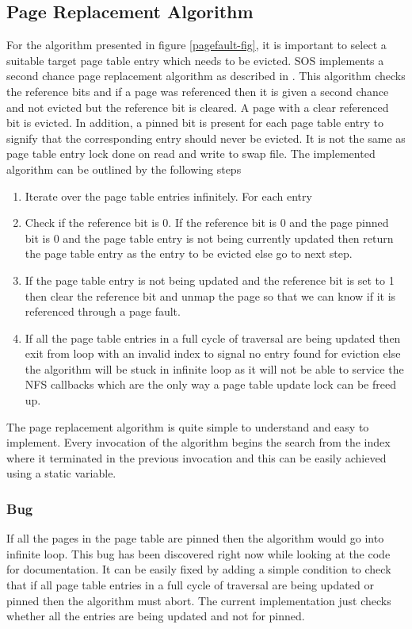 \documentclass[a4paper, 11pt]{article}
\begin{document}
\subsection{Page Replacement Algorithm}
For the algorithm presented in figure \ref{pagefault-fig}, it is
important to select a suitable target page table entry which needs to
be evicted. SOS implements a second chance page replacement algorithm
as described in \cite[Page~399]{tanenbaum}. This algorithm checks the
reference bits and if a page was referenced then it is given a second
chance and not evicted but the reference bit is cleared. A page with a
clear referenced bit is evicted. In addition, a pinned bit is present
for each page table entry to signify that the corresponding entry
should never be evicted. It is not the same as page table entry lock done
on read and write to swap file. The implemented algorithm can be
outlined by the following steps
\begin{enumerate}
\item Iterate over the page table entries infinitely. For each entry
\item Check if the reference bit is 0. If the reference bit is 0 and
  the page pinned bit is 0 and the page table entry is not being
  currently updated then return the page table entry as the entry to
  be evicted else go to next step.
\item If the page table entry is not being updated and the reference
  bit is set to 1 then clear the reference bit and unmap the page so
  that we can know if it is referenced through a page fault.
\item If all the page table entries in a full cycle of traversal are
  being updated then exit from loop with an invalid index to signal no
  entry found for eviction else the algorithm will be stuck in
  infinite loop as it will not be able to service the NFS callbacks
  which are the only way a page table update lock can be freed up.
\end{enumerate}
The page replacement algorithm is quite simple to understand and easy
to implement. Every invocation of the algorithm begins the search from
the index where it terminated in the previous invocation and this can
be easily achieved using a static variable.

\subsubsection{Bug}
If all the pages in the page table are pinned then the algorithm would
go into infinite loop. This bug has been discovered right now while
looking at the code for documentation. It can be easily fixed by
adding a simple condition to check that if all page table entries in a
full cycle of traversal are being updated or pinned then the algorithm
must abort. The current implementation just checks whether all the
entries are being updated and not for pinned. 
\end{document}

